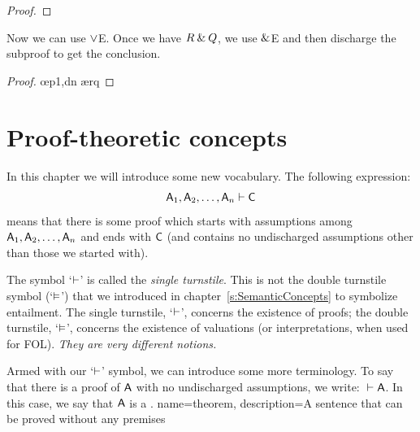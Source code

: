 \begin{proof}
	 	
	\open
		 
\end{proof}
Now we can use $\vee$E. Once we have $R \mathbin{\&} Q$, we use $\mathbin{\&}$E and then discharge the subproof to get the conclusion.

\begin{proof}
	 	
	\open
		 
		 \oe{p1,dn}
		 \ae{rq}
	\close
\end{proof}




\chapter{Proof-theoretic concepts}\label{s:ProofTheoreticConcepts}

In this chapter we will introduce some new vocabulary. The following expression:
$$\mathsf{A}_1, \mathsf{A}_2, \ldots, \mathsf{A}_n \vdash \mathsf{C}$$
means that there is some proof which starts with assumptions among $\mathsf{A}_1, \mathsf{A}_2, \ldots, \mathsf{A}_n$ and ends with $\mathsf{C}$ (and contains no undischarged assumptions other than those we started with).  

The symbol `$\vdash$' is called the \emph{single turnstile}. This is not the {double turnstile} symbol (`$\vDash$') that we introduced in chapter~\ref{s:SemanticConcepts} to symbolize entailment. The single turnstile, `$\vdash$', concerns the existence of proofs; the double turnstile, `$\vDash$', concerns the existence of valuations (or interpretations, when used for FOL). \emph{They are very different notions.}

Armed with our `$\vdash$' symbol, we can introduce some more terminology. To say that there is a proof of $\mathsf{A}$ with no undischarged assumptions, we write: ${} \vdash \mathsf{A}$. In this case, we say that $\mathsf{A}$ is a .
{
name=theorem,
description={A sentence that can be proved without any premises}
}

